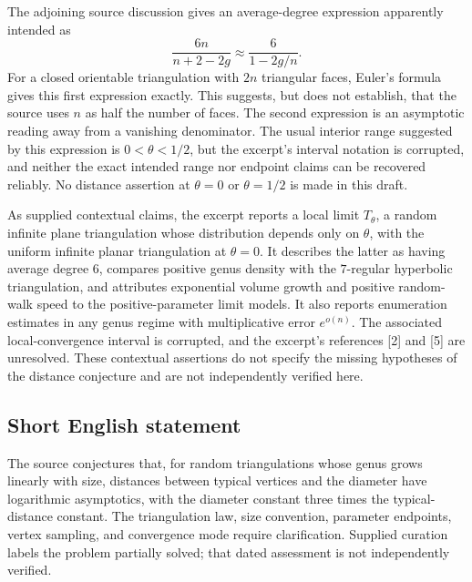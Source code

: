 \documentclass[11pt]{article}
\begin{document}
The adjoining source discussion gives an average-degree expression apparently intended as
\[
\frac{6n}{n+2-2g}\approx\frac{6}{1-2g/n}.
\]
For a closed orientable triangulation with \(2n\) triangular faces, Euler's formula gives this first expression exactly. This suggests, but does not establish, that the source uses \(n\) as half the number of faces. The second expression is an asymptotic reading away from a vanishing denominator. The usual interior range suggested by this expression is \(0<\theta<1/2\), but the excerpt's interval notation is corrupted, and neither the exact intended range nor endpoint claims can be recovered reliably. No distance assertion at \(\theta=0\) or \(\theta=1/2\) is made in this draft.

As supplied contextual claims, the excerpt reports a local limit \(T_\theta\), a random infinite plane triangulation whose distribution depends only on \(\theta\), with the uniform infinite planar triangulation at \(\theta=0\). It describes the latter as having average degree \(6\), compares positive genus density with the \(7\)-regular hyperbolic triangulation, and attributes exponential volume growth and positive random-walk speed to the positive-parameter limit models. It also reports enumeration estimates in any genus regime with multiplicative error \(e^{o(n)}\). The associated local-convergence interval is corrupted, and the excerpt's references [2] and [5] are unresolved. These contextual assertions do not specify the missing hypotheses of the distance conjecture and are not independently verified here.
\subsection{Short English statement}
The source conjectures that, for random triangulations whose genus grows linearly with size, distances between typical vertices and the diameter have logarithmic asymptotics, with the diameter constant three times the typical-distance constant. The triangulation law, size convention, parameter endpoints, vertex sampling, and convergence mode require clarification. Supplied curation labels the problem partially solved; that dated assessment is not independently verified.
\end{document}
